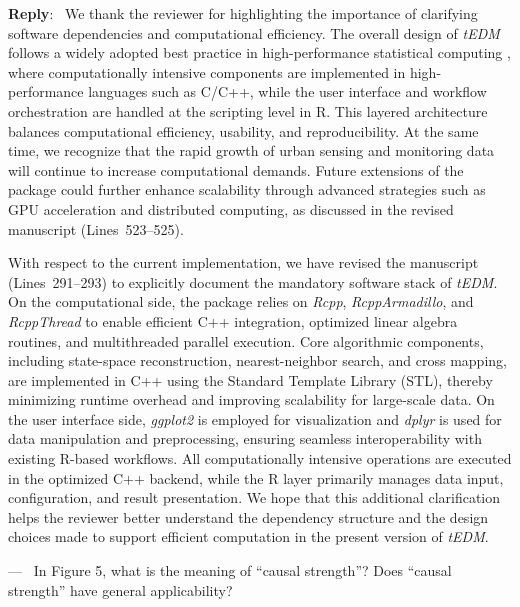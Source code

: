 \documentclass[11pt]{article}
\newcounter{reviewer}
\newcounter{point}[reviewer]
\renewcommand{\thepoint}{Comment\,\thereviewer.\arabic{point}}
\newenvironment{point}
   {\refstepcounter{point} \bigskip \noindent {\textbf{Reviewer~\thepoint} } ---\ }
   {\par }
\newenvironment{reply}
   {\medskip \noindent \color{blue} \begin{sf}\textbf{Reply}:\  }
   {\medskip \par \end{sf}}
\begin{document}
\begin{reply}
We thank the reviewer for highlighting the importance of clarifying software dependencies and computational efficiency. The overall design of \textit{tEDM} follows a widely adopted best practice in high-performance statistical computing \citep{rcpp,rcppthread,ropensci,r}, where computationally intensive components are implemented in high-performance languages such as C/C++, while the user interface and workflow orchestration are handled at the scripting level in R. This layered architecture balances computational efficiency, usability, and reproducibility. At the same time, we recognize that the rapid growth of urban sensing and monitoring data will continue to increase computational demands. Future extensions of the package could further enhance scalability through advanced strategies such as GPU acceleration and distributed computing, as discussed in the revised manuscript (Lines~523--525).

With respect to the current implementation, we have revised the manuscript (Lines~291--293) to explicitly document the mandatory software stack of \textit{tEDM}. On the computational side, the package relies on \textit{Rcpp}, \textit{RcppArmadillo}, and \textit{RcppThread} to enable efficient C++ integration, optimized linear algebra routines, and multithreaded parallel execution. Core algorithmic components, including state-space reconstruction, nearest-neighbor search, and cross mapping, are implemented in C++ using the Standard Template Library (STL), thereby minimizing runtime overhead and improving scalability for large-scale data. On the user interface side, \textit{ggplot2} is employed for visualization and \textit{dplyr} is used for data manipulation and preprocessing, ensuring seamless interoperability with existing R-based workflows. All computationally intensive operations are executed in the optimized C++ backend, while the R layer primarily manages data input, configuration, and result presentation. We hope that this additional clarification helps the reviewer better understand the dependency structure and the design choices made to support efficient computation in the present version of \textit{tEDM}.
\end{reply}

\begin{point}
In Figure 5, what is the meaning of ``causal strength''? Does ``causal strength'' have general applicability?
\end{point}
\end{document}
